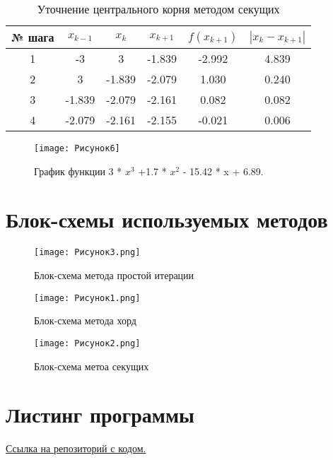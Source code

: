 \documentclass[12pt]{report}
\begin{document}
	\begin{table}[h!]
		\centering
		\begin{tabular}{|c|c|c|c|c|c|}
			\hline
			№ шага & $x_{k-1}$ & $x_k$ & $x_{k+1}$ & $f(x_{k+1})$ & $|x_k - x_{k+1}|$ \\ \hline
			
			1 & -3 & 3 & -1.839 & -2.992 & 4.839 \\ \hline
			
			2 & 3 & -1.839 & -2.079 & 1.030 & 0.240 \\ \hline
			
			3 & -1.839 & -2.079 & -2.161 & 0.082 & 0.082 \\ \hline
			
			4 & -2.079 & -2.161 & -2.155 & -0.021 & 0.006 \\ \hline
		\end{tabular}
		\caption{Уточнение центрального корня методом секущих}
		\label{tab:3}
	\end{table}	
	
	\begin{figure}[h]
		\centering
		\texttt{[image: Рисунок6]}
		\label{fig:1}
		\caption{График функции 3 * $x^3$ +1.7 * $x^2$ - 15.42 * x + 6.89.}
	\end{figure}
	\newpage
	
	\section*{Блок-схемы используемых методов}
	
	\begin{figure}[H]
		\centering
		\texttt{[image: Рисунок3.png]}
		\caption{Блок-схема метода простой итерации}
	\end{figure}
	
	\begin{figure}[H]
		\centering
		\texttt{[image: Рисунок1.png]}
		\caption{Блок-схема метода хорд}
	\end{figure}
	
	\begin{figure}[H]
		\centering
		\texttt{[image: Рисунок2.png]}
		\caption{Блок-схема метоа секущих}
	\end{figure}
	
	\section*{Листинг программы}
	\href{https://github.com/mysticslippers/math_comp_archive/blob/main/Lab2_comp_math/code/main.py}{Ссылка на репозиторий с кодом.}
	\newpage
	
\end{document}
